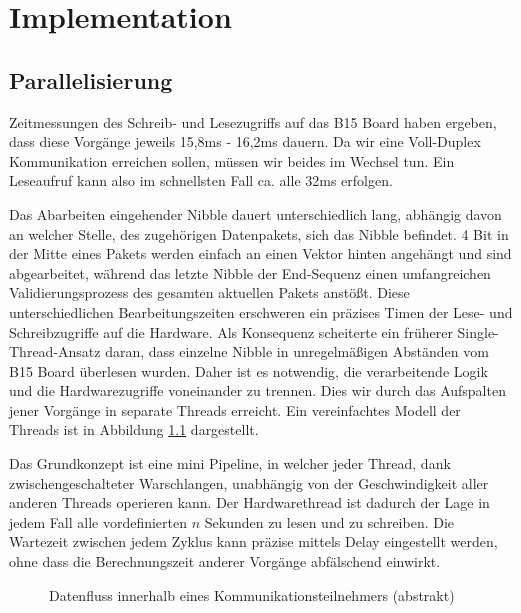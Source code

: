 \chapter{Implementation}
\section{Parallelisierung}
Zeitmessungen des Schreib- und Lesezugriffs auf das B15 Board haben ergeben, dass diese Vorgänge jeweils 15,8ms - 16,2ms dauern. Da wir eine Voll-Duplex Kommunikation erreichen sollen, müssen wir beides im Wechsel tun. Ein Leseaufruf kann also im schnellsten Fall ca. alle 32ms erfolgen.

Das Abarbeiten eingehender Nibble dauert unterschiedlich lang, abhängig davon an welcher Stelle, des zugehörigen Datenpakets, sich das Nibble befindet. 4 Bit in der Mitte eines Pakets werden einfach an einen Vektor hinten angehängt und sind abgearbeitet, während das letzte Nibble der End-Sequenz einen umfangreichen Validierungsprozess des gesamten aktuellen Pakets anstößt. Diese unterschiedlichen Bearbeitungszeiten erschweren ein präzises Timen der Lese- und Schreibzugriffe auf die Hardware. Als Konsequenz scheiterte ein früherer Single-Thread-Ansatz daran, dass einzelne Nibble in unregelmäßigen Abständen vom B15 Board überlesen wurden. Daher ist es notwendig, die verarbeitende Logik und die Hardwarezugriffe voneinander zu trennen. Dies wir durch das Aufspalten jener Vorgänge in separate Threads erreicht. Ein vereinfachtes Modell der Threads ist in Abbildung \ref{fig:datenfluss} dargestellt.

Das Grundkonzept ist eine mini Pipeline, in welcher jeder Thread, dank zwischengeschalteter Warschlangen, unabhängig von der Geschwindigkeit aller anderen Threads operieren kann. Der Hardwarethread ist dadurch der Lage in jedem Fall alle vordefinierten $n$ Sekunden zu lesen und zu schreiben. Die Wartezeit zwischen jedem Zyklus kann präzise mittels Delay eingestellt werden, ohne dass die Berechnungszeit anderer Vorgänge abfälschend einwirkt.

\begin{figure}[H]
    \centering
    \begin{adjustbox}{scale=0.6}
        
    \end{adjustbox}
    \caption{Datenfluss innerhalb eines Kommunikationsteilnehmers (abstrakt)}
    \label{fig:datenfluss}
\end{figure}

